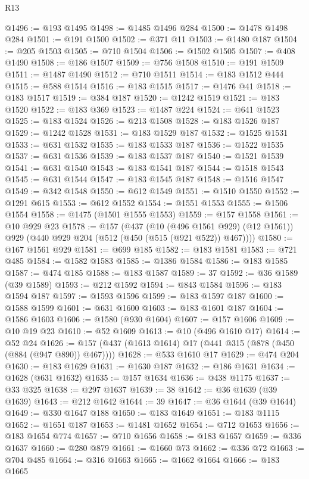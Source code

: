 \begin{lexlean}{R13}
\begin{coremodule}
@1496 := @193 @1495
@1498 := @1485 @1496 @284
@1500 := @1478 @1498 @284
@1501 := @191 @1500
@1502 := @371 @11
@1503 := @1480 @187
@1504 := @205 @1503
@1505 := @710 @1504
@1506 := @1502 @1505
@1507 := @408 @1490
@1508 := @186 @1507
@1509 := @756 @1508
@1510 := @191 @1509
@1511 := @1487 @1490
@1512 := @710 @1511
@1514 := @183 @1512 @444
@1515 := @588 @1514
@1516 := @183 @1515
@1517 := @1476 @41
@1518 := @183 @1517
@1519 := @384 @187
@1520 := @1242 @1519
@1521 := @183 @1520
@1522 := @183 @369
@1523 := @1487 @224
@1524 := @641 @1523
@1525 := @183 @1524
@1526 := @213 @1508
@1528 := @183 @1526 @187
@1529 := @1242 @1528
@1531 := @183 @1529 @187
@1532 := @1525 @1531
@1533 := @631 @1532
@1535 := @183 @1533 @187
@1536 := @1522 @1535
@1537 := @631 @1536
@1539 := @183 @1537 @187
@1540 := @1521 @1539
@1541 := @631 @1540
@1543 := @183 @1541 @187
@1544 := @1518 @1543
@1545 := @631 @1544
@1547 := @183 @1545 @187
@1548 := @1516 @1547
@1549 := @342 @1548
@1550 := @612 @1549
@1551 := @1510 @1550
@1552 := @1291 @615
@1553 := @612 @1552
@1554 := @1551 @1553
@1555 := @1506 @1554
@1558 := @1475 (@1501 @1555 @1553)
@1559 := @157 @1558
@1561 := @10 @929 @23
@1578 := @157
    (@437
      (@10 (@496 @1561 @929) (@12 @1561))
      @929
      (@440 @929 @204 (@512 (@450 (@515 (@921 @522)) @467))))
@1580 := @167 @1561 @929
@1581 := @699 @185
@1582 := @183 @1581
@1583 := @721 @485
@1584 := @1582 @1583
@1585 := @1386 @1584
@1586 := @183 @1585
@1587 := @474 @185
@1588 := @183 @1587
@1589 := 37
@1592 := @36 @1589 (@39 @1589)
@1593 := @212 @1592
@1594 := @843 @1584
@1596 := @183 @1594 @187
@1597 := @1593 @1596
@1599 := @183 @1597 @187
@1600 := @1588 @1599
@1601 := @631 @1600
@1603 := @183 @1601 @187
@1604 := @1586 @1603
@1606 := @1580 (@930 @1604)
@1607 := @157 @1606
@1609 := @10 @19 @23
@1610 := @52 @1609
@1613 := @10 (@496 @1610 @17)
@1614 := @52 @24
@1626 := @157 (@437 (@1613 @1614) @17 (@441 @315 (@878 (@450 (@884 (@947 @890)) @467))))
@1628 := @533 @1610 @17
@1629 := @474 @204
@1630 := @183 @1629
@1631 := @1630 @187
@1632 := @186 @1631
@1634 := @1628 (@631 @1632)
@1635 := @157 @1634
@1636 := @438 @1175
@1637 := @33 @325
@1638 := @297 @1637
@1639 := 38
@1642 := @36 @1639 (@39 @1639)
@1643 := @212 @1642
@1644 := 39
@1647 := @36 @1644 (@39 @1644)
@1649 := @330 @1647 @188
@1650 := @183 @1649
@1651 := @183 @1115
@1652 := @1651 @187
@1653 := @1481 @1652
@1654 := @712 @1653
@1656 := @183 @1654 @774
@1657 := @710 @1656
@1658 := @183 @1657
@1659 := @336 @1637
@1660 := @280 @879
@1661 := @1660 @73
@1662 := @336 @72
@1663 := @704 @485
@1664 := @316 @1663
@1665 := @1662 @1664
@1666 := @183 @1665

\end{coremodule}
\end{lexlean}
